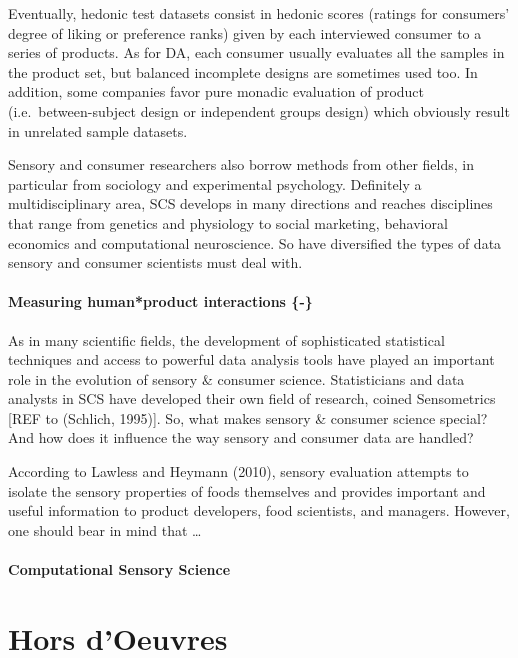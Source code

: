 \documentclass[
]{book}
\begin{document}
Eventually, hedonic test datasets consist in hedonic scores (ratings for consumers' degree of liking or preference ranks) given by each interviewed consumer to a series of products. As for DA, each consumer usually evaluates all the samples in the product set, but balanced incomplete designs are sometimes used too. In addition, some companies favor pure monadic evaluation of product (i.e.~between-subject design or independent groups design) which obviously result in unrelated sample datasets.

Sensory and consumer researchers also borrow methods from other fields, in particular from sociology and experimental psychology. Definitely a multidisciplinary area, SCS develops in many directions and reaches disciplines that range from genetics and physiology to social marketing, behavioral economics and computational neuroscience. So have diversified the types of data sensory and consumer scientists must deal with.

\hypertarget{measuring-humanproduct-interactions--}{%
\subsection{Measuring human*product interactions \{-\}}\label{measuring-humanproduct-interactions--}}

As in many scientific fields, the development of sophisticated statistical techniques and access to powerful data analysis tools have played an important role in the evolution of sensory \& consumer science. Statisticians and data analysts in SCS have developed their own field of research, coined Sensometrics {[}REF to (Schlich, 1995){]}. So, what makes sensory \& consumer science special? And how does it influence the way sensory and consumer data are handled?

According to Lawless and Heymann (2010), sensory evaluation attempts to isolate the sensory properties of foods themselves and provides important and useful information to product developers, food scientists, and managers. However, one should bear in mind that \ldots{}

\hypertarget{computational-sensory-science}{%
\subsection*{Computational Sensory Science}\label{computational-sensory-science}}

\hypertarget{part-hors-doeuvres}{%
\part*{Hors d'Oeuvres}\label{part-hors-doeuvres}}
\end{document}

